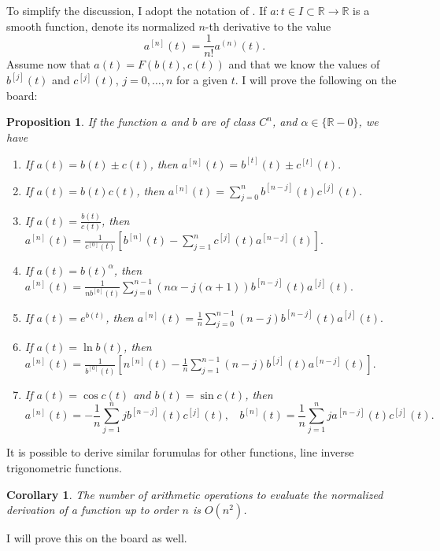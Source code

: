 \documentclass[11pt]{article}
\def\RR{\mathbb{R} }
\def\f{\frac }
\newtheorem{proposition}[theorem]{Proposition}
\newtheorem{corollary}[theorem]{Corollary}
\newenvironment{remark}[1][Remark]{\begin{trivlist}
\item[\hskip \labelsep {\bfseries #1}]}{\end{trivlist}}
\begin{document}
To simplify the discussion, I adopt the notation of \cite{taylor1.4}.
If $a : t \in I \subset \RR \to \RR$ is a smooth function, denote its normalized $n$-th derivative to the value
\[ a^{[n]} (t) = \f{1}{n!} a ^{(n)} (t) .\]
Assume now that $a(t) = F(b(t),c(t))$ and that we know the values of $b^{[j]} (t)$ and $c^{[j]} (t)$, $j= 0,\ldots, n$ for a given $t$.
I will prove the following on the board:
\begin{proposition} If the function $a$ and $b$ are of class $C^n$, and $\alpha \in \{ \RR - 0 \}$, we have
\begin{enumerate}
\item If $a(t) = b(t) \pm c(t) $, then $a^{[n]}(t) = b^{[t]}(t) \pm c^{[t]}(t).$
\item If $a(t) = b(t) c(t) $, then $a^{[n]}(t) = \sum _{j=0} ^n b^{[n-j]}(t) c^{[j]}(t).$
\item If $a(t) = \f{b(t)}{ c(t)} $, then $a^{[n]}(t) =  \f{1}{ c^{[0]}(t)} \left [ b^{[n]}(t) - \sum _{j=1} ^n c^{[j]}(t) a^{[n-j]}(t) \right ].$
\item If $a(t) = b(t)^{\alpha } $, then $a^{[n]}(t) =  \f{1}{ nb^{[0]}(t)} \sum _{j=0} ^{n-1} \left ( n \alpha - j(\alpha +1 ) \right ) b^{[n-j]}(t) a^{[j]}(t).$
\item If $a(t) = e^{b(t)}$, then $a^{[n]}(t) =  \f{1}{ n} \sum _{j=0} ^{n-1} \left ( n - j \right ) b^{[n-j]}(t) a^{[j]}(t).$
\item If $a(t) = \ln b(t)$, then $a^{[n]}(t) =  \f{1}{ b^{[0]}(t)} \left [ n^{[n]} (t) - \f{1}{n} \sum _{j=1} ^{n-1} \left ( n - j \right ) b^{[j]}(t) a^{[n-j]}(t) \right ].$
\item If $a(t) = \cos c(t)$ and $b(t) = \sin c(t)$, then 
\[a^{[n]}(t) =  -\f{1}{ n} \sum _{j=1} ^{n} j b^{[n-j]}(t) c^{[j]}(t),~~~~b^{[n]}(t) =  \f{1}{ n} \sum _{j=1} ^{n} j a^{[n-j]}(t) c^{[j]}(t) .\]
\end{enumerate}
\label{pr:mainprop}
\end{proposition}

\begin{remark} It is possible to derive similar forumulas for other functions, line inverse trigonometric functions.
\end{remark}

\begin{corollary} The number of arithmetic operations to evaluate the normalized derivation of a function up to order $n$ is $O(n^2)$.
\end{corollary}

I will prove this on the board as well.
\end{document}
